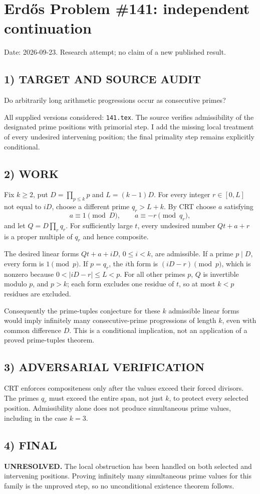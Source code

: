 \section{Erd\H{o}s Problem \#141: independent continuation}
\noindent Date: 2026-09-23. Research attempt; no claim of a new published result.
\subsection{1) TARGET AND SOURCE AUDIT}
Do arbitrarily long arithmetic progressions occur as consecutive primes?

All supplied versions considered: \texttt{141.tex}.
The source verifies admissibility of the designated prime positions with primorial step. I add the missing local treatment of every undesired intervening position; the final primality step remains explicitly conditional.
\subsection{2) WORK}
Fix $k\ge2$, put $D=\prod_{p\le k}p$ and $L=(k-1)D$. For every integer $r\in[0,L]$ not equal to $iD$, choose a different prime $q_r>L+k$. By CRT choose $a$ satisfying
\[
a\equiv1\pmod D,\qquad a\equiv-r\pmod{q_r},
\]
and let $Q=D\prod_rq_r$. For sufficiently large $t$, every undesired number $Qt+a+r$ is a proper multiple of $q_r$ and hence composite.

The desired linear forms $Qt+a+iD$, $0\le i<k$, are admissible. If a prime $p\mid D$, every form is $1\pmod p$. If $p=q_r$, the $i$th form is $(iD-r)\pmod p$, which is nonzero because $0<|iD-r|\le L<p$. For all other primes $p$, $Q$ is invertible modulo $p$, and $p>k$; each form excludes one residue of $t$, so at most $k<p$ residues are excluded.

Consequently the prime-tuples conjecture for these $k$ admissible linear forms would imply infinitely many consecutive-prime progressions of length $k$, even with common difference $D$. This is a conditional implication, not an application of a proved prime-tuples theorem.
\subsection{3) ADVERSARIAL VERIFICATION}
CRT enforces compositeness only after the values exceed their forced divisors. The primes $q_r$ must exceed the entire span, not just $k$, to protect every selected position. Admissibility alone does not produce simultaneous prime values, including in the case $k=3$.
\subsection{4) FINAL}
\textbf{UNRESOLVED.}
The local obstruction has been handled on both selected and intervening positions. Proving infinitely many simultaneous prime values for this family is the unproved step, so no unconditional existence theorem follows.
